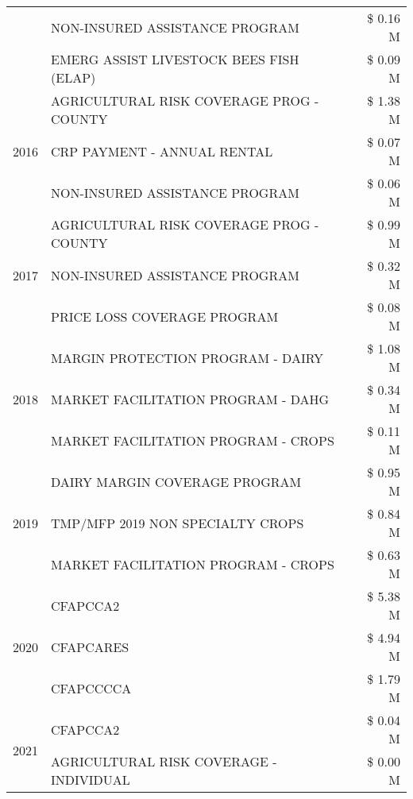 \begin{tabular}{llr}
 & NON-INSURED ASSISTANCE PROGRAM & \$ 0.16 M \\
 & EMERG ASSIST LIVESTOCK BEES FISH (ELAP) & \$ 0.09 M \\
\cline{1-3}
\multirow[t]{3}{*}{2016} & AGRICULTURAL RISK COVERAGE PROG - COUNTY & \$ 1.38 M \\
 & CRP PAYMENT - ANNUAL RENTAL & \$ 0.07 M \\
 & NON-INSURED ASSISTANCE PROGRAM & \$ 0.06 M \\
\cline{1-3}
\multirow[t]{3}{*}{2017} & AGRICULTURAL RISK COVERAGE PROG - COUNTY & \$ 0.99 M \\
 & NON-INSURED ASSISTANCE PROGRAM & \$ 0.32 M \\
 & PRICE LOSS COVERAGE PROGRAM & \$ 0.08 M \\
\cline{1-3}
\multirow[t]{3}{*}{2018} & MARGIN PROTECTION PROGRAM - DAIRY & \$ 1.08 M \\
 & MARKET FACILITATION PROGRAM - DAHG & \$ 0.34 M \\
 & MARKET FACILITATION PROGRAM - CROPS & \$ 0.11 M \\
\cline{1-3}
\multirow[t]{3}{*}{2019} & DAIRY MARGIN COVERAGE PROGRAM & \$ 0.95 M \\
 & TMP/MFP 2019 NON SPECIALTY CROPS & \$ 0.84 M \\
 & MARKET FACILITATION PROGRAM - CROPS & \$ 0.63 M \\
\cline{1-3}
\multirow[t]{3}{*}{2020} & CFAPCCA2 & \$ 5.38 M \\
 & CFAPCARES & \$ 4.94 M \\
 & CFAPCCCCA & \$ 1.79 M \\
\cline{1-3}
\multirow[t]{2}{*}{2021} & CFAPCCA2 & \$ 0.04 M \\
 & AGRICULTURAL RISK COVERAGE - INDIVIDUAL & \$ 0.00 M \\
\cline{1-3}
\bottomrule
\end{tabular}
